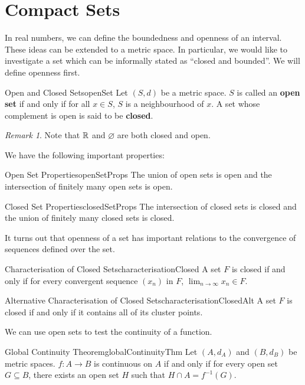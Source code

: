 \documentclass[math]{amznotes}
\theoremstyle{remark}
\newtheorem*{remark}{Remark}
\begin{document}
\section{Compact Sets}
In real numbers, we can define the boundedness and openness of an interval. These ideas can be extended to a metric space. In particular, we would like to investigate a set which can be informally stated as ``closed and bounded''. We will define openness first.
\begin{dfnbox}{Open and Closed Sets}{openSet}
    Let $(S, d)$ be a metric space. $S$ is called an {\color{red} \textbf{open set}} if and only if for all $x \in S$, $S$ is a neighbourhood of $x$. A set whose complement is open is said to be {\color{red} \textbf{closed}}.
\end{dfnbox} 
\begin{notebox}
    \begin{remark}
        Note that $\mathbb{R}$ and $\varnothing$ are both closed and open.
    \end{remark}
\end{notebox}
We have the following important properties:
\begin{thmbox}{Open Set Properties}{openSetProps}
    The union of open sets is open and the intersection of finitely many open sets is open.
\end{thmbox}
\begin{thmbox}{Closed Set Properties}{closedSetProps}
    The intersection of closed sets is closed and the union of finitely many closed sets is closed.
\end{thmbox}
It turns out that openness of a set has important relations to the convergence of sequences defined over the set.
\begin{thmbox}{Characterisation of Closed Sets}{characterisationClosed}
    A set $F$ is closed if and only if for every convergent sequence $(x_n)$ in $F$, $\lim_{n \to \infty}x_n \in F$.
\end{thmbox}
\begin{thmbox}{Alternative Characterisation of Closed Sets}{characterisationClosedAlt}
    A set $F$ is closed if and only if it contains all of its cluster points.
\end{thmbox}
We can use open sets to test the continuity of a function.
\begin{thmbox}{Global Continuity Theorem}{globalContinuityThm}
    Let $(A, d_A)$ and $(B, d_B)$ be metric spaces. $f \colon A \to B$ is continuous on $A$ if and only if for every open set $G \subseteq B$, there exists an open set $H$ such that $H \cap A = f^{-1}(G)$.
\end{thmbox}
\end{document}
